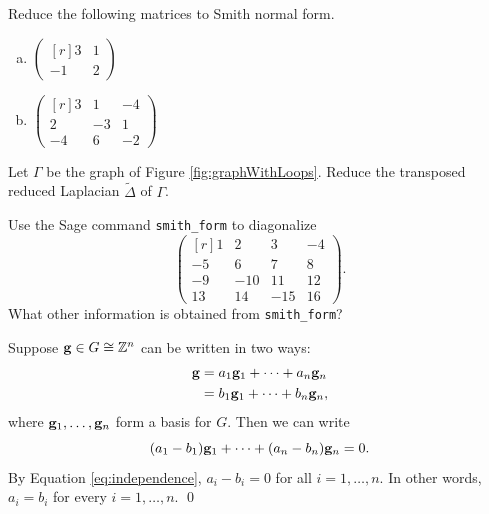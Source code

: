 \documentclass[../algebraNotesMSRI-UP2016.tex]{subfiles}
\begin{document}
\begin{frame}[c]{}{}
\begin{exe}[cf. Problem 76]\label{exe:prob76}
Reduce the following matrices to Smith normal form. 
\begin{enumerate}[(a)]
\item $\begin{pmatrix*}[r]	
	3 & 1 \\
	-1 & 2
	\end{pmatrix*}$
\item $\begin{pmatrix*}[r]
	3 & 1 & -4 \\
	2 & -3 & 1 \\
	-4 & 6 & -2
	\end{pmatrix*}$
\end{enumerate}
\end{exe}

\smallGap
\begin{exe}[cf. Problem 77]\label{exe:prob77}
Let $\Gamma$ be the graph of Figure \ref{fig:graphWithLoops}.  Reduce the transposed reduced Laplacian $\tilde{\Delta}$ of $\Gamma$.
\end{exe}
\end{frame}
 
\begin{frame}[fragile,c]{}{}
\begin{exe}[cf. Problem 78]\label{exe:prob78}
Use the Sage command \verb|smith_form| to diagonalize
\[
\begin{pmatrix*}[r]
1 & 2 & 3 & -4 \\
-5 & 6 & 7 & 8 \\
-9 & -10 & 11 & 12 \\
13 & 14 & -15 & 16
\end{pmatrix*}.
\]
What other information is obtained from \verb|smith_form|?
\end{exe}
\end{frame}

\answerKey
\begin{frame}{\subsecname}
Suppose $\mathbf g\in G\cong \mathbb Z^n$ can be written in two ways:
\begin{align*}
\mathbf g &= a_1\mathbf g_1+\cdots +a_n\mathbf g_n \\
	&= b_1\mathbf g_1+\cdots + b_n\mathbf g_n,
\end{align*}
where $\mathbf g_1,\dots, \mathbf g_n$ form a basis for $G$.  Then we can write 
\[
(a_1-b_1)\mathbf g_1+\cdots +(a_n-b_n)\mathbf g_n=0.
\]
By Equation \eqref{eq:independence}, $a_i-b_i=0$ for all $i=1,\dots, n$.  In other words, $a_i=b_i$ for every $i=1,\dots,n$.
\qed
\end{frame}
\end{document}
